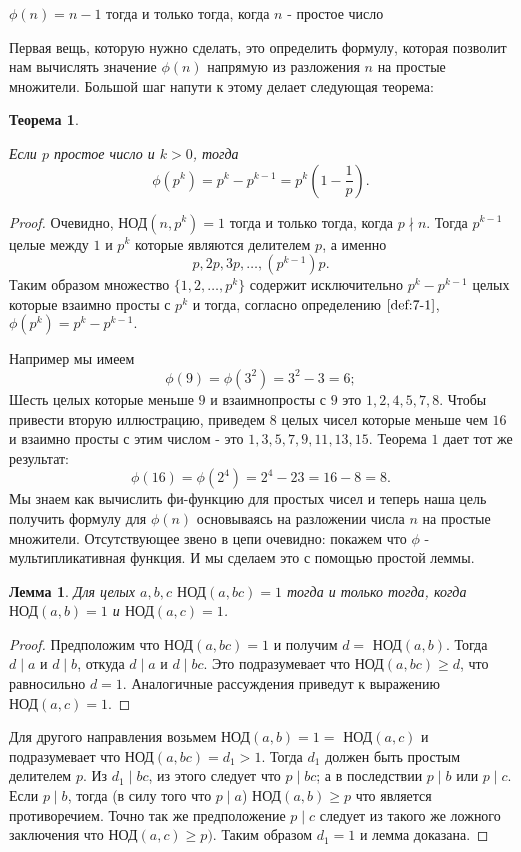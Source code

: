 \documentclass[11pt]{article}
\newtheorem{theorem}{Теорема}
\newtheorem{lemma}{Лемма}
\begin{document}
\begin{center}
	$\phi (n)=n-1$ тогда и только тогда, когда $n$ - простое число
\end{center}
Первая вещь, которую нужно сделать, это определить формулу, которая позволит нам вычислять значение $\phi (n)$ напрямую из разложения $n$ на простые множители. Большой шаг напути к этому делает следующая теорема: 
\begin{theorem}
\label{th:7-1}
	
	Если $ p $ простое число и $ k>0 $, тогда 
	\[\phi (p^{k})=	p^{k}-p^{k-1}=p^{k}(1-\dfrac{1}{p}).\]
\end{theorem} 
\begin{proof}
	Очевидно,  $\text{НОД}(n,p^k)=1$ тогда и только тогда, когда $p\nmid n$. Тогда $p^{k-1}$ целые между $1$ и $p^{k}$ которые являются делителем $p$, а именно  
	\[p,2p,3p, \ldots, (p^{k-1})p.\] Таким образом множество $\{1,2,\ldots,p^k\}$ содержит исключительно $p^{k}-p^{k-1}$ целых которые взаимно просты с $p^k$ и тогда, согласно определению $\ref{def:7-1}$, $\phi (p^k)=p^{k}-p^{k-1}.$	
	
	Например мы имеем 
	\[
	\phi (9)=\phi (3^2)=3^{2}-3=6;
	\]
	Шесть целых которые меньше $9$ и взаимнопросты с $9$ это $1, 2, 4, 5, 7, 8$.
	Чтобы привести вторую иллюстрацию, приведем $8$ целых чисел которые меньше чем $16$ и взаимно просты с этим числом - это $1,3,5,7,9,11,13,15$. Теорема $1$ дает тот же результат:
	\[
	\phi (16)= \phi (2^4)=2^{4}-2{3}=16-8=8.
	\]
	Мы знаем как вычислить фи-функцию для простых чисел и теперь наша цель получить формулу для $\phi (n)$ основываясь на разложении числа $n$ на простые множители. Отсутствующее звено в цепи очевидно: покажем что $\phi $ - мультипликативная функция. И мы сделаем это с помощью простой леммы.
	
\begin{lemma}
Для целых $a, b, c$  $\text{НОД}(a,bc) = 1$ тогда и только тогда, когда  $\text{НОД}(a,b)=1$ и  $\text{НОД}(a,c)=1$.
\end{lemma}
\begin{proof}
	Предположим что  $\text{НОД}(a,bc)=1$ и получим $d=$ $\text{НОД}(a,b)$. Тогда $d\mid a$ и $d\mid b$, откуда $d \mid a$ и $d\mid bc$. Это подразумевает что НОД$(a,bc) \geq d$, что равносильно $d=1$. Аналогичные рассуждения приведут к выражению  $\text{НОД}(a,c)=1$. 
\end{proof}
	Для другого направления возьмем  $\text{НОД}(a,b)=1=$ $\text{НОД}(a,c)$ и подразумевает что  $\text{НОД}(a,bc)=d_{1}>1.$ Тогда $d_1$ должен быть простым делителем $p$. Из $d_{1} \mid bc$, из этого следует что $p \mid bc$; а в последствии $p \mid b$ или $p \mid c$. Если $p \mid b$, тогда (в силу того что $p \mid a$)  $\text{НОД}(a,b) \geq p $ что является противоречием. Точно так же предположение $p \mid c$ следует из такого же ложного заключения что  $\text{НОД}(a,c) \geq p)$. Таким образом $d_1 = 1$ и лемма доказана.
\end{proof}
\end{document}

